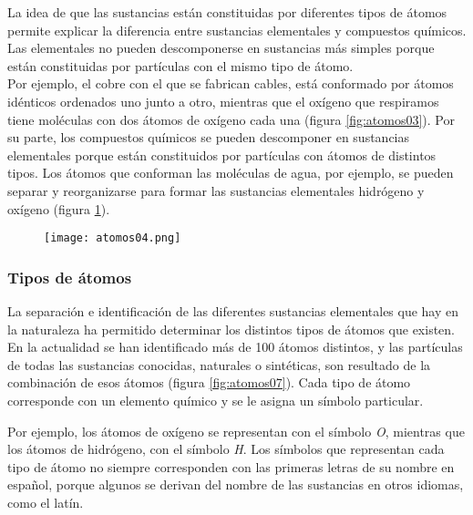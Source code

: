 La idea de que las sustancias están constituidas por diferentes
tipos de átomos permite explicar la diferencia entre sustancias elementales y
compuestos químicos. Las elementales no pueden descomponerse en sustancias más simples porque están constituidas
por partículas con el mismo tipo de átomo.\\

Por ejemplo, el cobre con el que se fabrican cables, está conformado por átomos idénticos ordenados uno junto a otro,
mientras que el oxígeno que respiramos tiene moléculas con dos átomos de oxígeno cada una (figura
\ref{fig:atomos03}). Por su parte, los compuestos químicos se pueden descomponer en sustancias elementales
porque están constituidos por partículas con átomos de distintos tipos. Los átomos que conforman las moléculas de agua, por ejemplo, se pueden separar
y reorganizarse para formar las sustancias elementales hidrógeno y oxígeno (figura \ref{fig:atomos04}).\\

\begin{figure}[H]
    \centering
    \texttt{[image: atomos04.png]}
    \label{fig:atomos04}
\end{figure}

\subsubsection{Tipos de \'atomos}

La separación e identificación de las diferentes sustancias elementales que
hay en la naturaleza ha permitido determinar los distintos tipos de átomos
que existen. En la actualidad se han identificado más de 100 átomos
distintos, y las partículas de todas las sustancias conocidas, naturales o sintéticas,
son resultado de la combinación de esos átomos
(figura \ref{fig:atomos07}). Cada tipo de átomo corresponde con un elemento
químico y se le asigna un símbolo particular.

Por ejemplo, los
átomos de oxígeno se representan con el símbolo \emph{O}, mientras que
los átomos de hidrógeno, con el símbolo \emph{H}. Los símbolos que representan
cada tipo de átomo no siempre corresponden con las primeras letras
de su nombre en español, porque algunos se derivan del nombre de las sustancias
en otros idiomas, como el latín.\\

